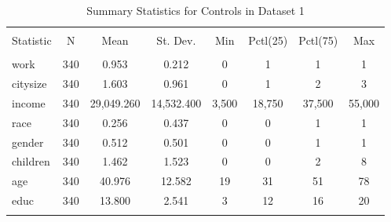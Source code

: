 
\begin{table}[!htbp] \centering 
  \caption{Summary Statistics for Controls in Dataset 1} 
  \label{} 
\begin{tabular}{@{\extracolsep{5pt}}lccccccc} 
\\[-1.8ex]\hline 
\hline \\[-1.8ex] 
Statistic & \multicolumn{1}{c}{N} & \multicolumn{1}{c}{Mean} & \multicolumn{1}{c}{St. Dev.} & \multicolumn{1}{c}{Min} & \multicolumn{1}{c}{Pctl(25)} & \multicolumn{1}{c}{Pctl(75)} & \multicolumn{1}{c}{Max} \\ 
\hline \\[-1.8ex] 
work & 340 & 0.953 & 0.212 & 0 & 1 & 1 & 1 \\ 
citysize & 340 & 1.603 & 0.961 & 0 & 1 & 2 & 3 \\ 
income & 340 & 29,049.260 & 14,532.400 & 3,500 & 18,750 & 37,500 & 55,000 \\ 
race & 340 & 0.256 & 0.437 & 0 & 0 & 1 & 1 \\ 
gender & 340 & 0.512 & 0.501 & 0 & 0 & 1 & 1 \\ 
children & 340 & 1.462 & 1.523 & 0 & 0 & 2 & 8 \\ 
age & 340 & 40.976 & 12.582 & 19 & 31 & 51 & 78 \\ 
educ & 340 & 13.800 & 2.541 & 3 & 12 & 16 & 20 \\ 
\hline \\[-1.8ex] 
\end{tabular} 
\end{table} 
